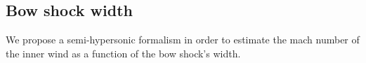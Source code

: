 \subsection{Bow shock width}

We propose a semi-hypersonic formalism in order to estimate the mach number of the inner wind as a function
of the bow shock's width.

